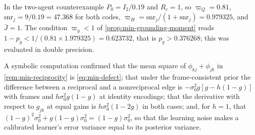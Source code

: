 \begin{numcheck}\label{chk:min-grounding-moment}
In the two-agent counterexample $P_0=I_2/0.19$ and $R_c=1$, so $\varpi_Q=0.81$, $\mathrm{snr}_j=9/0.19=47.368$ for both codes, $\varpi_H=\mathrm{snr}_j/(1+\mathrm{snr}_j)=0.979325$, and $\bar J=1$. The condition $\varpi_g<1$ of \cref{prop:min-grounding-moment} reads $1-p_g<1/(0.81\times1.979325)=0.623732$, that is $p_g>0.376268$; this was evaluated in double precision.
\end{numcheck}

\begin{numcheck}\label{chk:min-reciprocity}
A symbolic computation confirmed that the mean square of $\phi_{kj}+\phi_{jk}$ in \cref{rem:min-reciprocity} is \eqref{eq:min-defect}; that under the frame-consistent prior the difference between a reciprocal and a nonreciprocal edge is $-\sigma_0^2g[g-h(1-g)]$ with frames and $h\sigma_0^2g(1-g)$ at identity encodings; that the derivative with respect to $g_{jk}$ at equal gains is $h\sigma_0^2(1-2g)$ in both cases; and, for $h=1$, that $(1-g)^2\sigma_0^2+g(1-g)\sigma_0^2=(1-g)\sigma_0^2$, so that the learning noise makes a calibrated learner's error variance equal to its posterior variance.
\end{numcheck}
